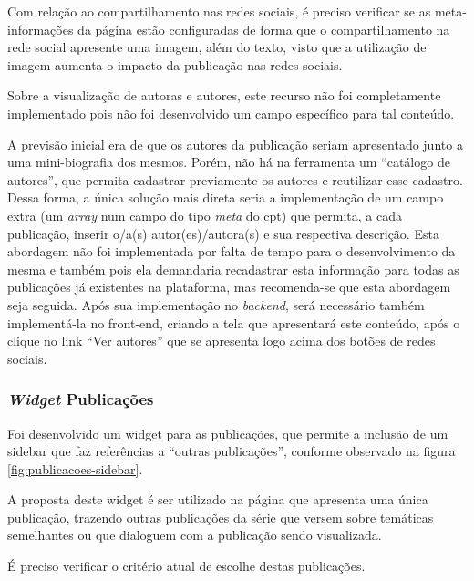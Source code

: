 Com relação ao compartilhamento nas redes sociais, é preciso verificar se as meta-informações da página estão configuradas de forma que o compartilhamento na rede social apresente uma imagem, além do texto, visto que a utilização de imagem aumenta o impacto da publicação nas redes sociais.

Sobre a visualização de autoras e autores, este recurso não foi completamente implementado pois não foi desenvolvido um campo específico para tal conteúdo.

A previsão inicial era de que os autores da publicação seriam apresentado junto a uma mini-biografia dos mesmos. Porém, não há na ferramenta um ``catálogo de autores'', que permita cadastrar previamente os autores e reutilizar esse cadastro. Dessa forma, a única solução mais direta seria a implementação de um campo extra (um \textit{array} num campo do tipo \textit{meta} do \gls{cpt}) que permita, a cada publicação, inserir o/a(s) autor(es)/autora(s)
e sua respectiva descrição. Esta abordagem não foi implementada por falta de tempo para o desenvolvimento da mesma e também pois ela demandaria recadastrar esta informação para todas as publicações já existentes na plataforma, mas recomenda-se que esta abordagem seja seguida. Após sua implementação no \textit{backend}, será necessário também implementá-la no front-end, criando a tela que apresentará este conteúdo, após o clique no link ``Ver autores'' que se apresenta logo acima dos botões de redes sociais. 

\subsubsection*{\textit{Widget} Publicações}
Foi desenvolvido um \gls{widget} para as publicações, que permite a inclusão de um \gls{sidebar} que faz referências a ``outras publicações'', conforme observado na figura \ref{fig:publicacoes-sidebar}.

A proposta deste \gls{widget} é ser utilizado na página que apresenta uma única publicação, trazendo outras publicações da série \ppod que versem sobre temáticas semelhantes ou que dialoguem com a publicação sendo visualizada.

É preciso verificar o critério atual de escolhe destas publicações.

